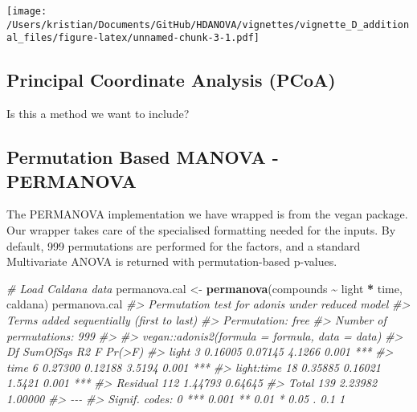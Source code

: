 \documentclass[
]{article}
\newenvironment{Shaded}{\begin{snugshade}}{\end{snugshade}}
\newcommand{\CommentTok}[1]{\textcolor[rgb]{0.56,0.35,0.01}{\textit{#1}}}
\newcommand{\FunctionTok}[1]{\textcolor[rgb]{0.13,0.29,0.53}{\textbf{#1}}}
\newcommand{\NormalTok}[1]{#1}
\newcommand{\OtherTok}[1]{\textcolor[rgb]{0.56,0.35,0.01}{#1}}
\newcommand{\SpecialCharTok}[1]{\textcolor[rgb]{0.81,0.36,0.00}{\textbf{#1}}}
\begin{document}
\texttt{[image: /Users/kristian/Documents/GitHub/HDANOVA/vignettes/vignette\_D\_additional\_files/figure-latex/unnamed-chunk-3-1.pdf]}

\hypertarget{principal-coordinate-analysis-pcoa}{%
\subsection{Principal Coordinate Analysis
(PCoA)}\label{principal-coordinate-analysis-pcoa}}

Is this a method we want to include?

\hypertarget{permutation-based-manova---permanova}{%
\subsection{Permutation Based MANOVA -
PERMANOVA}\label{permutation-based-manova---permanova}}

The PERMANOVA implementation we have wrapped is from the vegan package.
Our wrapper takes care of the specialised formatting needed for the
inputs. By default, 999 permutations are performed for the factors, and
a standard Multivariate ANOVA is returned with permutation-based
p-values.

\begin{Shaded}
\begin{Highlighting}[]
\CommentTok{\# Load Caldana data}
\NormalTok{permanova.cal }\OtherTok{\textless{}{-}} \FunctionTok{permanova}\NormalTok{(compounds }\SpecialCharTok{\textasciitilde{}}\NormalTok{ light }\SpecialCharTok{*}\NormalTok{ time, caldana)}
\NormalTok{permanova.cal}
\CommentTok{\#\textgreater{} Permutation test for adonis under reduced model}
\CommentTok{\#\textgreater{} Terms added sequentially (first to last)}
\CommentTok{\#\textgreater{} Permutation: free}
\CommentTok{\#\textgreater{} Number of permutations: 999}
\CommentTok{\#\textgreater{} }
\CommentTok{\#\textgreater{} vegan::adonis2(formula = formula, data = data)}
\CommentTok{\#\textgreater{}             Df SumOfSqs      R2      F Pr(\textgreater{}F)    }
\CommentTok{\#\textgreater{} light        3  0.16005 0.07145 4.1266  0.001 ***}
\CommentTok{\#\textgreater{} time         6  0.27300 0.12188 3.5194  0.001 ***}
\CommentTok{\#\textgreater{} light:time  18  0.35885 0.16021 1.5421  0.001 ***}
\CommentTok{\#\textgreater{} Residual   112  1.44793 0.64645                  }
\CommentTok{\#\textgreater{} Total      139  2.23982 1.00000                  }
\CommentTok{\#\textgreater{} {-}{-}{-}}
\CommentTok{\#\textgreater{} Signif. codes:  0 \textquotesingle{}***\textquotesingle{} 0.001 \textquotesingle{}**\textquotesingle{} 0.01 \textquotesingle{}*\textquotesingle{} 0.05 \textquotesingle{}.\textquotesingle{} 0.1 \textquotesingle{} \textquotesingle{} 1}
\end{Highlighting}
\end{Shaded}
\end{document}
